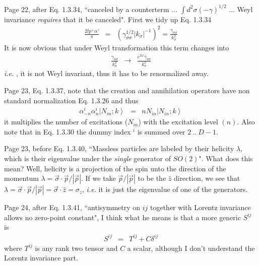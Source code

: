 \documentclass[aps,preprint,preprintnumbers,nofootinbib,showpacs,prd]{revtex4-1}
\newcommand{\ie}{{\it i.e.} }
\newcommand{\nbea}{\begin{eqnarray*}}
\newcommand{\neea}{\end{eqnarray*}}
\begin{document}
Page 22, after Eq. 1.3.34, ``canceled by a counterterm ... $\int d^2\sigma(-\gamma)^{1/2}$ ... Weyl invariance {\it requires} that it be canceled". First we tidy up Eq. 1.3.34
%
\nbea
\frac{2 l p^+ \alpha'}{\pi} & = & \left ( \gamma_{\sigma\sigma}^{1/2} |k_\sigma|^{-1} \right )^2 = \frac{\gamma_{\sigma\sigma}}{k^2_\sigma}
\neea
%
It is now obvious that under Weyl transformation this term changes into
%
\nbea
\frac{\gamma_{\sigma\sigma}}{k^2_\sigma} & \rightarrow & \frac{e^{2\omega}\gamma_{\sigma\sigma}}{k^2_\sigma}
\neea
%
\ie, it is not Weyl invariant, thus it has to be renormalized away.

Page 23, Eq. 1.3.37, note that the creation and annihilation operators have non standard normalization Eq. 1.3.26 and thus
%
\nbea
\alpha^i_{-n} \alpha^i_{n} \left. | N_{in} ; k \right \rangle & = & n N_{in} \left. | N_{in} ;  k \right \rangle
\neea
%
it multiplies the number of excitations ($N_{in}$) with the excitation level $(n)$. Also note that in Eq. 1.3.30 the dummy index $^i$ is summed over $2~ .. ~D-1$.

Page 23, before Eq. 1.3.40, ``Massless particles are labeled by their helicity $\lambda$, which is their eigenvalue under the {\it single} generator of $SO(2)$". What does this mean? Well, helicity is a projection of the spin unto the direction of the momentum $\lambda = \vec\sigma \cdot \vec p / |\vec p|$. If we take $\vec p / |\vec p|$ to be the $\hat z$ direction, we see that $\lambda = \vec\sigma \cdot \vec p / |\vec p| = \vec\sigma \cdot \hat z = \sigma_z$, \ie it is just the eigenvalue of one of the generators.

Page 24, after Eq. 1.3.41, ``antisymmetry on $ij$ together with Lorentz invariance allows no zero-point constant", I think what he means is that a more generic $S^{ij}$ is
%
\nbea
S^{ij} & = & T^{ij} + C \delta^{ij}
\neea
%
where $T^{ij}$ is any rank two tensor and $C$ a scalar, although I don't understand the Lorentz invariance part.
\end{document}
